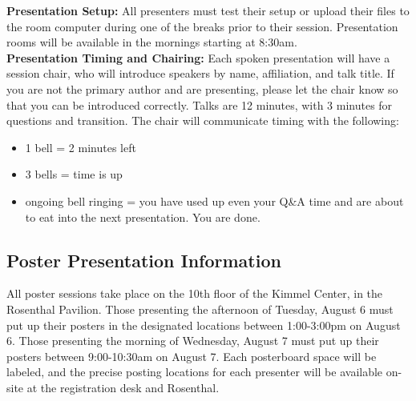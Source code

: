\noindent \textbf{Presentation Setup:} All presenters must test their setup or upload their files to the room computer during one of the breaks prior to their session.  Presentation rooms will be available in the mornings starting at 8:30am.\\

\noindent \textbf{Presentation Timing and Chairing:} Each spoken presentation will have a session chair, who will introduce speakers by name, affiliation, and talk title. If you are not the primary author and are presenting, please let the chair know so that you can be introduced correctly. Talks are 12 minutes, with 3 minutes for questions and transition. The chair will communicate timing with the following: 
\begin{itemize}
\item 1 bell = 2 minutes left
\item 3 bells = time is up
\item ongoing bell ringing = you have used up even your Q\&A time and are about to eat into the next presentation. You are done.
\end{itemize}

\subsection*{Poster Presentation Information}
All poster sessions take place on the 10th floor of the Kimmel Center, in the Rosenthal Pavilion. Those presenting the afternoon of Tuesday, August 6 must put up their posters in the designated locations between 1:00-3:00pm on August 6. Those presenting the morning of Wednesday, August 7 must put up their posters between 9:00-10:30am on August 7. Each posterboard space will be labeled, and the precise posting locations for each presenter will be available on-site at the registration desk and Rosenthal.


